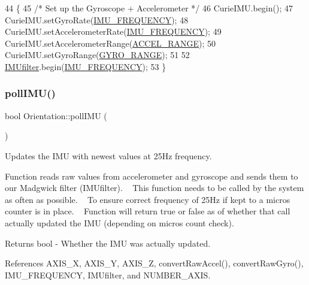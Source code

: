 \begin{DoxyCode}
44 \{
45   \textcolor{comment}{/* Set up the Gyroscope + Accelerometer */}
46   CurieIMU.begin();
47   CurieIMU.setGyroRate(\hyperlink{_orientation_8cpp_aacb21c2e16f8c38c985b8f02787a7baf}{IMU\_FREQUENCY});
48   CurieIMU.setAccelerometerRate(\hyperlink{_orientation_8cpp_aacb21c2e16f8c38c985b8f02787a7baf}{IMU\_FREQUENCY});
49   CurieIMU.setAccelerometerRange(\hyperlink{_orientation_8cpp_a16ec7011dea5773b504e875852f35fc1}{ACCEL\_RANGE});
50   CurieIMU.setGyroRange(\hyperlink{_orientation_8cpp_af9a0775d43604d7410e3da3dbc90925a}{GYRO\_RANGE});
51 
52   \hyperlink{class_orientation_a3b0d70328334e69797438ccc408806c1}{IMUfilter}.begin(\hyperlink{_orientation_8cpp_aacb21c2e16f8c38c985b8f02787a7baf}{IMU\_FREQUENCY});
53 \}
\end{DoxyCode}
\mbox{\label{class_orientation_aad568a473f999c181abac46a4d832387}} 
\subsubsection{\texorpdfstring{poll\+I\+M\+U()}{pollIMU()}}
{\footnotesize\ttfamily bool Orientation\+::poll\+I\+MU (\begin{DoxyParamCaption}{ }\end{DoxyParamCaption})}



Updates the I\+MU with newest values at 25\+Hz frequency. 

Function reads raw values from accelerometer and gyroscope and sends them to our Madgwick filter (I\+M\+Ufilter). ~\newline
This function needs to be called by the system as often as possible. ~\newline
To ensure correct frequency of 25\+Hz if kept to a micros counter is in place. ~\newline
Function will return true or false as of whether that call actually updated the I\+MU (depending on micros count check).

\begin{DoxyReturn}{Returns}
bool -\/ Whether the I\+MU was actually updated. 
\end{DoxyReturn}


References A\+X\+I\+S\+\_\+X, A\+X\+I\+S\+\_\+Y, A\+X\+I\+S\+\_\+Z, convert\+Raw\+Accel(), convert\+Raw\+Gyro(), I\+M\+U\+\_\+\+F\+R\+E\+Q\+U\+E\+N\+CY, I\+M\+Ufilter, and N\+U\+M\+B\+E\+R\+\_\+\+A\+X\+IS.


